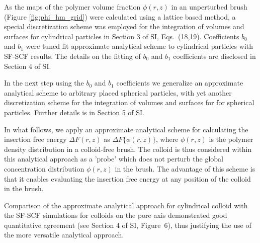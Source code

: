 \documentclass[12pt, a4paper]{article}
\begin{document}
As the maps of the polymer volume fraction $\phi(r,z)$ in an unperturbed brush (Figure \ref{fig:phi_hm_grid}) were calculated using a lattice based method, a special discretization scheme was employed for the integration of volumes and surfaces for cylindrical particles in
Section 3 of SI, Eqs.~(18,19).
Coefficients $b_0$ and $b_1$ were tuned fit approximate analytical scheme to cylindrical particles with SF-SCF results.
The details on the fitting of $b_0$ and $b_1$ coefficients are disclosed in Section 4 of SI.

In the next step using the $b_0$ and $b_1$ coefficients we generalize an approximate analytical scheme to arbitrary placed spherical particles, with yet another discretization scheme for the integration of volumes and surfaces for for spherical particles.
Further details is in Section 5 of SI.

In what follows, we apply an approximate analytical scheme for calculating the insertion free energy $\Delta F(r,z)$ as $\Delta F\{\phi(r,z)\}$, 
where $\phi(r,z)$ is the polymer density distribution in a colloid-free brush. 
The colloid is thus considered within this analytical approach as a 'probe' which does not perturb the global concentration distribution $\phi(r,z)$ in the brush. 
The advantage of this scheme is that it enables evaluating the insertion free energy at any position of the colloid in the brush.

Comparison of the approximate analytical approach for cylindrical colloid with the SF-SCF simulations for colloids on the pore axis demonstrated good quantitative agreement (see Section 4 of SI, Figure~6), 
thus justifying the use of the more versatile analytical approach.
\end{document}

